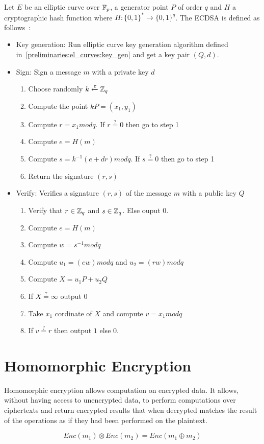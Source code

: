 Let $E$ be an elliptic curve over $\mathbb{F}_p$, a generator point $P$ of order $q$ and $H$ a cryptographic hash function where $H: \{0, 1\}^{*} \rightarrow  \{0, 1\}^{q}$. The ECDSA is defined as follows~\cite{elliptic_curves_2}:

\begin{itemize}
  \item Key generation: Run elliptic curve key generation algorithm defined in~\ref{preliminaries:el_curves:key_gen} and get a key pair $(Q, d)$.
  \item Sign: Sign a message $m$ with a private key $d$
    \begin{enumerate}
      \item Choose randomly $k \xleftarrow{\mathtt{r}}{\mathbb{Z}_q}$
      \item Compute the point $kP = (x_1, y_1)$
      \item Compute $r = x_1modq$. If $r \stackrel{?}{=} 0$ then go to step 1
      \item Compute $e = H(m)$
      \item Compute $s = k^{-1} (e + dr) modq$. If $s \stackrel{?}{=} 0$ then go to step 1
      \item Return the signature $(r, s)$
    \end{enumerate}
  \item Verify: Verifies a signature $(r, s)$ of the message $m$ with a public key $Q$
    \begin{enumerate}
      \item Verify that $r \in \mathbb{Z}_q$ and $s \in \mathbb{Z}_q$. Else ouput $0$.
      \item Compute $e = H(m)$
      \item Compute $w = s^{-1}modq$
      \item Compute $u_1 = (ew)modq$ and $u_2 = (rw)modq$
      \item Compute $X = u_1P + u_2Q$
      \item If $X \stackrel{?}{=} \infty$ output $0$
      \item Take $x_1$ cordinate of $X$ and compute $v = x_1modq$
      \item If $v \stackrel{?}{=} r$ then output $1$ else $0$.
    \end{enumerate}
\end{itemize}

\section{Homomorphic Encryption}
\label{preliminaries:homo}

Homomorphic encryption allows computation on encrypted data. It allows, without having access to unencrypted data, to perform computations over ciphertexts and return encrypted results that when decrypted matches the result of the operations as if they had been performed on the plaintext.

\begin{equation*}
  Enc(m_1) \otimes Enc(m_2) = Enc(m_1 \oplus m_2)
\end{equation*}
